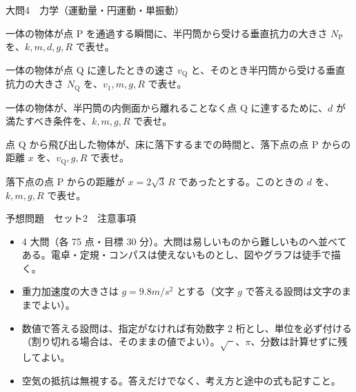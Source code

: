 \documentclass[paper=b5, fontsize=8pt, fleqn, twoside]{jlreq}
\begin{document}
\begin{ascolorbox4A}[75点・30分]{大問4　力学（運動量・円運動・単振動）}
\begin{qlist}[series=sd]
\item 一体の物体が点 P を通過する瞬間に、半円筒から受ける垂直抗力の大きさ $N_\mathrm{P}$ を、$k,m,d,g,R$ で表せ。
\item 一体の物体が点 Q に達したときの速さ $v_\mathrm{Q}$ と、そのとき半円筒から受ける垂直抗力の大きさ $N_\mathrm{Q}$ を、$v_1,m,g,R$ で表せ。
\item 一体の物体が、半円筒の内側面から離れることなく点 Q に達するために、$d$ が満たすべき条件を、$k,m,g,R$ で表せ。
\item 点 Q から飛び出した物体が、床に落下するまでの時間と、落下点の点 P からの距離 $x$ を、$v_\mathrm{Q},g,R$ で表せ。
\item 落下点の点 P からの距離が $x=2\sqrt{3}\,R$ であったとする。このときの $d$ を、$k,m,g,R$ で表せ。
\end{qlist}
\end{ascolorbox4A}
\clearpage
\begin{simple}[120分・300点]{予想問題　セット2　注意事項}
\begin{itemize}[leftmargin=1.2\zw,itemsep=0pt,topsep=1pt,parsep=0pt]
\item 4 大問（各 75 点・目標 30 分）。大問は易しいものから難しいものへ並べてある。電卓・定規・コンパスは使えないものとし、図やグラフは徒手で描く。
\item 重力加速度の大きさは $g=9.8\unit{m/s^2}$ とする（文字 $g$ で答える設問は文字のままでよい）。
\item 数値で答える設問は、指定がなければ有効数字 2 桁とし、単位を必ず付ける（割り切れる場合は、そのままの値でよい）。$\sqrt{\phantom{x}}$、$\pi$、分数は計算せずに残してよい。
\item 空気の抵抗は無視する。答えだけでなく、考え方と途中の式も記すこと。
\end{itemize}
\end{simple}
\end{document}
